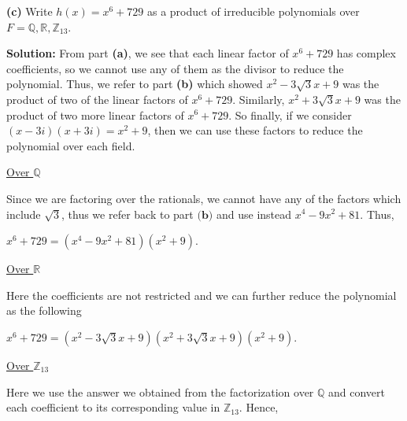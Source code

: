 \documentclass[12pt, a4paper]{article}
\begin{document}
\vspace{8mm}\par

\textbf{(c)} Write $h(x)=x^6+729$ as a product of irreducible polynomials over $F=\mathbb{Q},\mathbb{R},\mathbb{Z}_{13}$.

\vspace{4mm}

\noindent\textbf{Solution:} From part \textbf{(a)}, we see that each linear factor of $x^6+729$ has complex coefficients, so we cannot use any of them as the divisor to reduce the polynomial. Thus, we refer to part \textbf{(b)} which showed $x^2-3\sqrt{3}x+9$ was the product of two of the linear factors of $x^6+729$. Similarly, $x^2+3\sqrt{3}x+9$ was the product of two more linear factors of $x^6+729$. So finally, if we consider $(x-3i)(x+3i)=x^2+9$, then we can use these factors to reduce the polynomial over each field.

\vspace{4mm}

\noindent\underline{Over $\mathbb{Q}$}

\vspace{2mm}

\noindent Since we are factoring over the rationals, we cannot have any of the factors which include $\sqrt{3}$, thus we refer back to part $\textbf{(b)}$ and use instead $x^4-9x^2+81$. Thus,

\vspace{2mm}

\centerline{$x^6+729=(x^4-9x^2+81)(x^2+9)$.}

\vspace{4mm}

\noindent\underline{Over $\mathbb{R}$}

\vspace{2mm}

\noindent Here the coefficients are not restricted and we can further reduce the polynomial as the following

\vspace{2mm}

\centerline{$x^6+729=(x^2-3\sqrt{3}x+9)(x^2+3\sqrt{3}x+9)(x^2+9)$.}

\vspace{4mm}

\noindent\underline{Over $\mathbb{Z}_{13}$}

\vspace{2mm}

\noindent Here we use the answer we obtained from the factorization over $\mathbb{Q}$ and convert each coefficient to its corresponding value in $\mathbb{Z}_{13}$. Hence,
\end{document}
